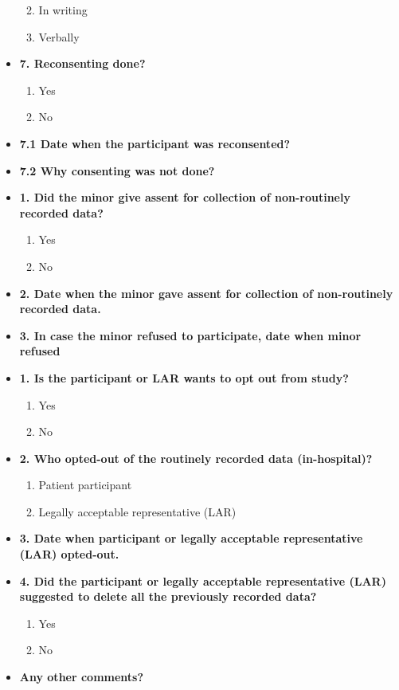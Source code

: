 \documentclass[
]{scrartcl}
\providecommand{\tightlist}{%
  \setlength{\itemsep}{0pt}\setlength{\parskip}{0pt}}\usepackage{longtable,booktabs,array}
\begin{document}
\begin{itemize}
  \begin{enumerate}
  \def\labelenumi{\arabic{enumi}.}
  \tightlist
  \item
    In writing
  \item
    Verbally
  \end{enumerate}
\item
  \textbf{7. Reconsenting done?}

  \begin{enumerate}
  \def\labelenumi{\arabic{enumi}.}
  \tightlist
  \item
    Yes
  \item
    No
  \end{enumerate}
\item
  \textbf{7.1 Date when the participant was reconsented?}
\item
  \textbf{7.2 Why consenting was not done?}
\item
  \textbf{1. Did the minor give assent for collection of non-routinely
  recorded data?}

  \begin{enumerate}
  \def\labelenumi{\arabic{enumi}.}
  \tightlist
  \item
    Yes
  \item
    No
  \end{enumerate}
\item
  \textbf{2. Date when the minor gave assent for collection of
  non-routinely recorded data.}
\item
  \textbf{3. In case the minor refused to participate, date when minor
  refused}
\item
  \textbf{1. Is the participant or LAR wants to opt out from study?}

  \begin{enumerate}
  \def\labelenumi{\arabic{enumi}.}
  \tightlist
  \item
    Yes
  \item
    No
  \end{enumerate}
\item
  \textbf{2. Who opted-out of the routinely recorded data
  (in-hospital)?}

  \begin{enumerate}
  \def\labelenumi{\arabic{enumi}.}
  \tightlist
  \item
    Patient participant
  \item
    Legally acceptable representative (LAR)
  \end{enumerate}
\item
  \textbf{3. Date when participant or legally acceptable representative
  (LAR) opted-out.}
\item
  \textbf{4. Did the participant or legally acceptable representative
  (LAR) suggested to delete all the previously recorded data?}

  \begin{enumerate}
  \def\labelenumi{\arabic{enumi}.}
  \tightlist
  \item
    Yes
  \item
    No
  \end{enumerate}
\item
  \textbf{Any other comments?}
\end{itemize}
\end{document}
